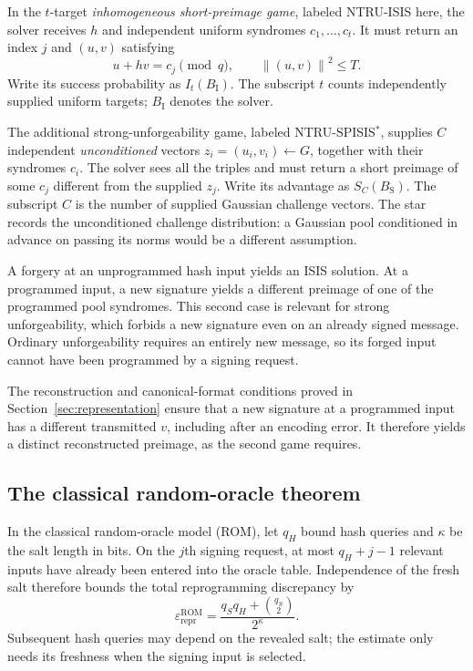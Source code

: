 \documentclass[11pt,a4paper]{article}
\newcommand{\eps}{\varepsilon}
\newcommand{\norm}[1]{\left\lVert#1\right\rVert}
\theoremstyle{definition}
\theoremstyle{remark}
\numberwithin{equation}{section}
\begin{document}
In the $t$-target \emph{inhomogeneous short-preimage game}, labeled
NTRU-ISIS here, the solver receives
$h$ and independent uniform syndromes $c_1,\ldots,c_t$. It must return an
index $j$ and $(u,v)$ satisfying
\begin{equation}
 u+hv=c_j\pmod q,\qquad \norm{(u,v)}^2\le T.
\end{equation}
Write its success probability as
$I_t(B_{\mathrm I})$. The subscript $t$ counts independently supplied
uniform targets; $B_{\mathrm I}$ denotes the solver.

The additional strong-unforgeability game, labeled NTRU-SPISIS$^*$,
supplies $C$ independent
\emph{unconditioned} vectors $z_i=(u_i,v_i)\leftarrow G$, together with
their syndromes $c_i$. The solver sees all the triples and must return a
short preimage of some $c_j$ different from the supplied $z_j$. Write its
advantage as $S_C(B_{\mathrm S})$. The subscript $C$ is the number of
supplied Gaussian challenge vectors.
The star records the unconditioned challenge distribution: a Gaussian pool
conditioned in advance on passing its norms would be a different assumption.

A forgery at an unprogrammed hash input yields an ISIS solution. At a
programmed input, a new signature yields a different preimage of one of
the programmed pool syndromes. This second case is relevant for strong
unforgeability, which forbids a new signature even on an already signed
message. Ordinary unforgeability requires an entirely new message, so its
forged input cannot have been programmed by a signing request.

The reconstruction and canonical-format conditions proved in
Section~\ref{sec:representation} ensure that a new signature at a programmed
input has a different transmitted $v$, including after an encoding error.
It therefore yields a distinct reconstructed preimage, as the second game requires.

\subsection{The classical random-oracle theorem}

In the classical random-oracle model (ROM), let $q_H$ bound hash queries and $\kappa$ be the salt length in
bits. On the $j$th signing request, at most $q_H+j-1$ relevant inputs have
already been entered into the oracle table. Independence of the fresh salt
therefore bounds the total reprogramming discrepancy by
\begin{equation}
 \eps_{\mathrm{repr}}^{\mathrm{ROM}}
 =\frac{q_Sq_H+\binom{q_S}{2}}{2^\kappa}.
 \label{eq:rom-reprogram}
\end{equation}
Subsequent hash queries may depend on the revealed salt; the estimate only
needs its freshness when the signing input is selected.
\end{document}
